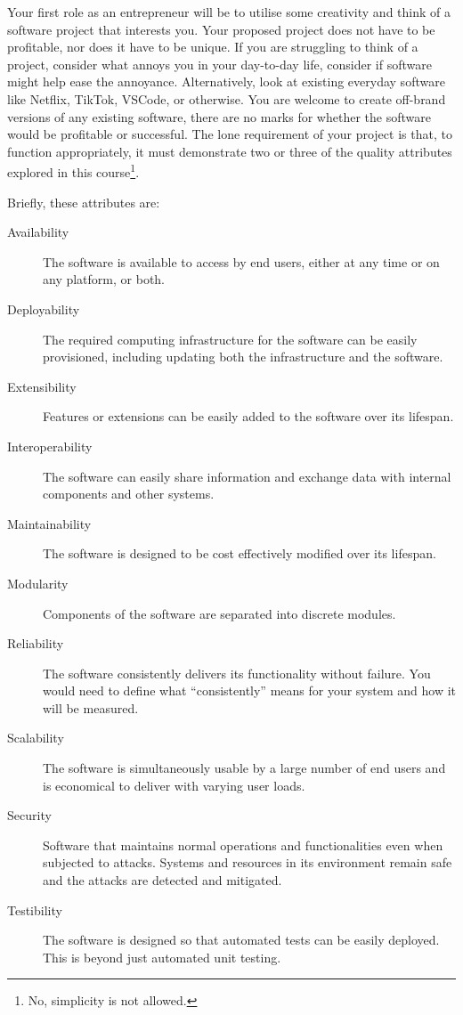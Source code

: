 \documentclass{csse4400}
\begin{document}
Your first role as an entrepreneur will be to utilise some creativity and think of a software project that interests you.
Your proposed project does not have to be profitable, nor does it have to be unique.
If you are struggling to think of a project, consider what annoys you in your day-to-day life, consider if software might help ease the annoyance.
Alternatively, look at existing everyday software like Netflix, TikTok, VSCode, or otherwise.
You are welcome to create off-brand versions of any existing software,
there are no marks for whether the software would be profitable or successful.
The lone requirement of your project is that, to function appropriately, it must demonstrate two or three of the quality attributes 
explored in this course\footnote{No, simplicity is not allowed.}.

Briefly, these attributes are:
\begin{description}
    \item[Availability] The software is available to access by end users, either at any time or on any platform, or both.
    \item[Deployability] The required computing infrastructure for the software can be easily provisioned, including updating both the infrastructure and the software.
    \item[Extensibility] Features or extensions can be easily added to the software over its lifespan.
    \item[Interoperability] The software can easily share information and exchange data with internal components and other systems.
    \item[Maintainability] The software is designed to be cost effectively modified over its lifespan.
    \item[Modularity] Components of the software are separated into discrete modules.
    \item[Reliability] The software consistently delivers its functionality without failure. You would need to define what ``consistently'' means for your system and how it will be measured.
    \item[Scalability] The software is simultaneously usable by a large number of end users and is economical to deliver with varying user loads.
    \item[Security] Software that maintains normal operations and functionalities even when subjected to attacks.
                             Systems and resources in its environment remain safe and the attacks are detected and mitigated.
    \item[Testibility] The software is designed so that automated tests can be easily deployed. This is beyond just automated unit testing.
\end{description}
\end{document}

